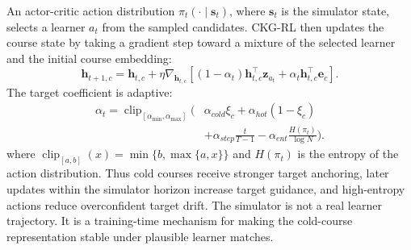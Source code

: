 \documentclass[letterpaper]{article}
\begin{document}
An actor-critic action distribution \(\pi_t(\cdot\mid\mathbf{s}_t)\), where \(\mathbf{s}_t\) is the simulator state, selects a learner \(a_t\) from the sampled candidates. CKG-RL then updates the course state by taking a gradient step toward a mixture of the selected learner and the initial course embedding:
\begin{equation}
\mathbf{h}_{t+1,c}=\mathbf{h}_{t,c}+\eta
\nabla_{\mathbf{h}_{t,c}}
\left[
(1-\alpha_t)\mathbf{h}_{t,c}^\top\mathbf{z}_{a_t}
+\alpha_t\mathbf{h}_{t,c}^\top\mathbf{e}_c
\right].
\end{equation}
The target coefficient is adaptive:
\begin{align}
\alpha_t=
\operatorname{clip}_{[\alpha_{\min},\alpha_{\max}]}\Big(
&\alpha_{cold}\xi_c+\alpha_{hot}(1-\xi_c) \nonumber\\
&+\alpha_{step}\frac{t}{T-1}
-\alpha_{ent}\frac{H(\pi_t)}{\log N}
\Big).
\end{align}
where \(\operatorname{clip}_{[a,b]}(x)=\min\{b,\max\{a,x\}\}\) and \(H(\pi_t)\) is the entropy of the action distribution.
Thus cold courses receive stronger target anchoring, later updates within the simulator horizon increase target guidance, and high-entropy actions reduce overconfident target drift. The simulator is not a real learner trajectory. It is a training-time mechanism for making the cold-course representation stable under plausible learner matches.
\end{document}

